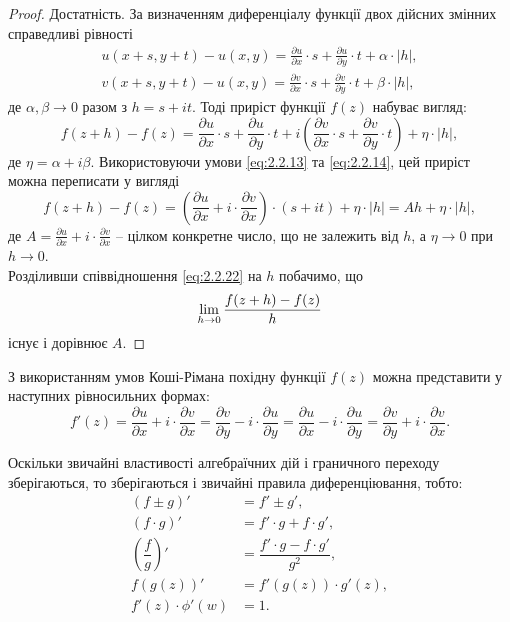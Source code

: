 \begin{proof}
	Достатність. За визначенням диференціалу функції двох дійсних змінних справедливі рівності
	\begin{align}
		\label{eq:2.2.19}
		u(x + s, y + t) - u(x, y) = \frac{\partial u}{\partial x} \cdot s + \frac{\partial u}{\partial y} \cdot t + \alpha \cdot |h|, \\
		\label{eq:2.2.20}
		v(x + s, y + t) - u(x, y) = \frac{\partial v}{\partial x} \cdot s + \frac{\partial v}{\partial y} \cdot t + \beta \cdot |h|,
	\end{align}
	де $\alpha, \beta \to 0$ разом з $h = s + it$. Тоді приріст функції $f(z)$ набуває вигляд:
	\begin{equation}
		\label{eq:2.2.21}
		f(z + h) - f(z) = \frac{\partial u}{\partial x} \cdot s + \frac{\partial u}{\partial y} \cdot t + i \left( \frac{\partial v}{\partial x} \cdot s + \frac{\partial v}{\partial y} \cdot t\right) + \eta \cdot |h|,
	\end{equation}
	де $\eta = \alpha + i \beta$. Використовуючи умови \eqref{eq:2.2.13} та \eqref{eq:2.2.14}, цей приріст можна переписати у вигляді
	\begin{equation}
		\label{eq:2.2.22}
		f(z + h) - f(z) = \left(\frac{\partial u}{\partial x} + i \cdot \frac{\partial v}{\partial x}\right) \cdot (s + it) + \eta \cdot |h| = A h + \eta \cdot |h|,
	\end{equation}
	де $A = \frac{\partial u}{\partial x} + i \cdot \frac{\partial v}{\partial x}$ -- цілком конкретне число, що не залежить від $h$, а $\eta \to 0$ при $h \to 0$. \\

	Розділивши співвідношення \eqref{eq:2.2.22} на $h$ побачимо, що 
	\begin{equation}
		\label{eq:2.2.23}
		\displaystyle\lim\limits_{h \to 0} \frac{f(z + h) - f(z)}{h}
	\end{equation}
	існує і дорівнює $A$.
\end{proof}

З використанням умов Коші-Рімана похідну функції $f(z)$ можна представити у наступних рівносильних формах:
\begin{equation}
	\label{eq:2.2.24}
	f'(z) = \dfrac{\partial u}{\partial x} + i \cdot \dfrac{\partial v}{\partial x} = \dfrac{\partial v}{\partial y} - i \cdot \dfrac{\partial u}{\partial y} = \dfrac{\partial u}{\partial x} - i \cdot \dfrac{\partial u}{\partial y} = \dfrac{\partial v}{\partial y} + i \cdot \dfrac{\partial v}{\partial x}.
\end{equation}

Оскільки звичайні властивості алгебраїчних дій і граничного переходу зберігаються, то зберігаються і звичайні правила диференціювання, тобто:
\begin{align}
	\label{eq:2.2.25}
	(f \pm g)' &= f' \pm g', \\
	\label{eq:2.2.26}
	(f \cdot g)' &= f' \cdot g + f \cdot g', \\
	\label{eq:2.2.27}
	\left(\dfrac fg\right)' &= \dfrac{f' \cdot g - f \cdot g'}{g^2}, \\
	\label{eq:2.2.28}
	f(g(z))' &= f'(g(z)) \cdot g'(z), \\
	\label{eq:2.2.29}
	f'(z) \cdot \phi'(w) &= 1.
\end{align}

